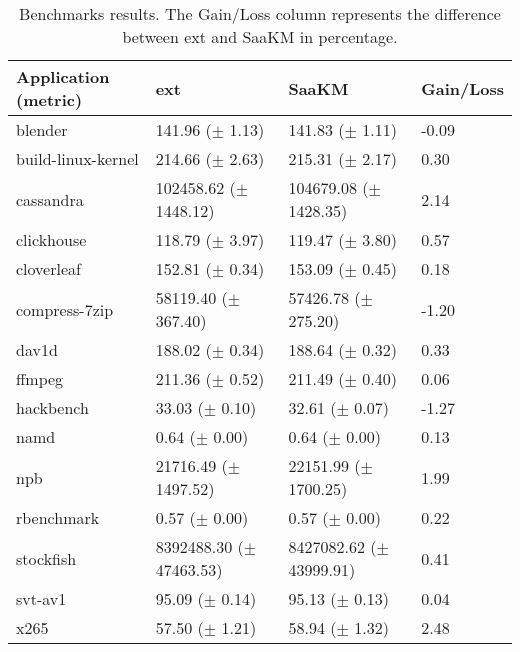 \begin{table*}[p]
        \centering
        \caption{Benchmarks results. The Gain/Loss column represents the difference between ext and SaaKM in percentage.}
        \label{tab:bench-res}
        \begin{tabular}{|l|l|l|l|}
        \hline
                Application (metric) & ext & SaaKM & Gain/Loss \\
                \hline
                blender & 141.96 ($\pm$ 1.13) & 141.83 ($\pm$ 1.11) & -0.09 \\
                build-linux-kernel & 214.66 ($\pm$ 2.63) & 215.31 ($\pm$ 2.17) & 0.30 \\
                cassandra & 102458.62 ($\pm$ 1448.12) & 104679.08 ($\pm$ 1428.35) & 2.14 \\
                clickhouse & 118.79 ($\pm$ 3.97) & 119.47 ($\pm$ 3.80) & 0.57 \\
                cloverleaf & 152.81 ($\pm$ 0.34) & 153.09 ($\pm$ 0.45) & 0.18 \\
                compress-7zip & 58119.40 ($\pm$ 367.40) & 57426.78 ($\pm$ 275.20) & -1.20 \\
                dav1d & 188.02 ($\pm$ 0.34) & 188.64 ($\pm$ 0.32) & 0.33 \\
                ffmpeg & 211.36 ($\pm$ 0.52) & 211.49 ($\pm$ 0.40) & 0.06 \\
                hackbench & 33.03 ($\pm$ 0.10) & 32.61 ($\pm$ 0.07) & -1.27 \\
                namd & 0.64 ($\pm$ 0.00) & 0.64 ($\pm$ 0.00) & 0.13 \\
                npb & 21716.49 ($\pm$ 1497.52) & 22151.99 ($\pm$ 1700.25) & 1.99 \\
                rbenchmark & 0.57 ($\pm$ 0.00) & 0.57 ($\pm$ 0.00) & 0.22 \\
                stockfish & 8392488.30 ($\pm$ 47463.53) & 8427082.62 ($\pm$ 43999.91) & 0.41 \\
                svt-av1 & 95.09 ($\pm$ 0.14) & 95.13 ($\pm$ 0.13) & 0.04 \\
                x265 & 57.50 ($\pm$ 1.21) & 58.94 ($\pm$ 1.32) & 2.48 \\
                \hline
        
\end{tabular}
        

\end{table*}
